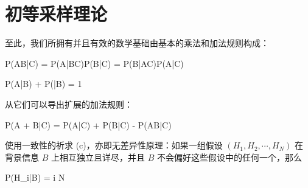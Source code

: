 \chapter[quantitative-rules]{初等采样理论}

至此，我们所拥有并且有效的数学基础由基本的乘法和加法规则构成：

\placeformula[3-1]
\startformula
P(AB|C) = P(A|BC)P(B|C) = P(B|AC)P(A|C)
\stopformula

\placeformula[3-2]
\startformula
P(A|B) + P(|B) = 1
\stopformula

从它们可以导出扩展的加法规则：

\placeformula[3-3]
\startformula
P(A + B|C) = P(A|C) + P(B|C) - P(AB|C)
\stopformula

使用一致性的祈求 (c)，亦即无差异性原理：如果一组假设 $(H_1,H_2,\cdots,H_N)$ 在背景信息 $B$ 上相互独立且详尽，并且 $B$ 不会偏好这些假设中的任何一个，那么

\placeformula[3-4]
\startformula
P(H_i|B) = \quad{}\le i \le N
\stopformula